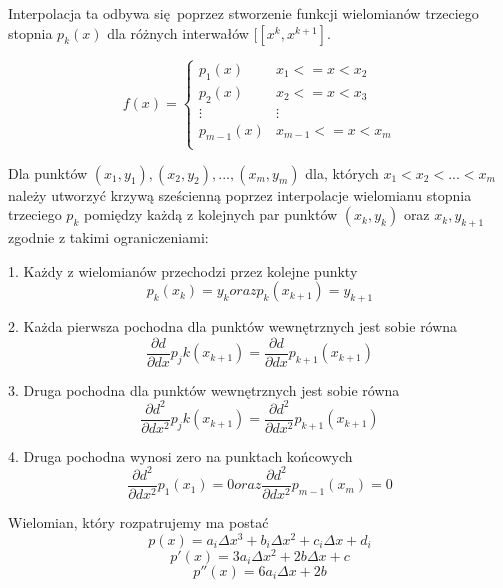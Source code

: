 \documentclass[varwidth,12pt,a4paper]{article}
\begin{document}
Interpolacja ta odbywa się poprzez stworzenie funkcji wielomianów trzeciego stopnia $ p_k(x) $
dla różnych interwałów $ [[x^k, x^{k+1}] $.

$$
    f(x) = \left\{ \begin{array}{ll}
    p_1 (x) & \textrm{$x_1 <= x < x_2$}\\
    p_2 (x) & \textrm{$x_2 <= x < x_3$}\\
    \vdots  & \vdots \\
    p_{m-1} (x) & \textrm{$x_{m-1} <= x < x_m$}\\
    \end{array} \right.
$$

Dla punktów $(x_1, y_1), (x_2, y_2), ..., (x_m, y_m)$ dla, których $x_1 < x_2 < ... < x_m $
należy utworzyć krzywą sześcienną poprzez interpolacje wielomianu stopnia trzeciego $p_k$ 
pomiędzy każdą z kolejnych par punktów $(x_k, y_k)$ oraz $x_{k}, y_{k+1}$ zgodnie z takimi ograniczeniami:

1. Każdy z wielomianów przechodzi przez kolejne punkty
\begin{equation}
    p_k (x_k) = y_k oraz p_k (x_{k+1}) = y_{k + 1}
\end{equation}

2. Każda pierwsza pochodna dla punktów wewnętrznych jest sobie równa
\begin{equation}
     \frac{\partial d}{\partial dx} p_jk (x_{k+1}) = \frac{\partial d}{\partial dx} p_{k+1} (x_{k+1})
\end{equation}

3. Druga pochodna dla punktów wewnętrznych jest sobie równa
\begin{equation}
     \frac{\partial d^2}{\partial dx^2} p_jk (x_{k+1}) = \frac{\partial d^2}{\partial dx^2} p_{k+1} (x_{k+1})
\end{equation}

4. Druga pochodna wynosi zero na punktach końcowych
\begin{equation}
     \frac{\partial d^2}{\partial dx^2} p_1 (x_{1}) = 0 oraz \frac{\partial d^2}{\partial dx^2} p_{m-1} (x_{m}) = 0
\end{equation}

Wielomian, który rozpatrujemy ma postać
\begin{equation}
    p(x) = a_i \Delta x^3 + b_i \Delta x^2 + c_i \Delta x + d_i
\end{equation}
\begin{equation}
    p'(x) = 3 a_i \Delta x^2 + 2b \Delta x + c
\end{equation}
\begin{equation}
    p''(x) = 6 a_i \Delta x + 2b
\end{equation}
\end{document}
